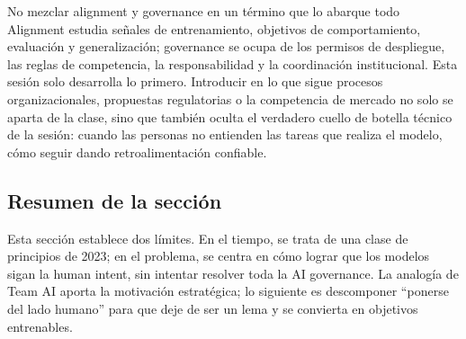 \begin{warningbox}{No mezclar alignment y governance en un término que lo abarque todo}
Alignment estudia señales de entrenamiento, objetivos de comportamiento, evaluación y generalización; governance se ocupa de los permisos de despliegue, las reglas de competencia, la responsabilidad y la coordinación institucional. Esta sesión solo desarrolla lo primero. Introducir en lo que sigue procesos organizacionales, propuestas regulatorias o la competencia de mercado no solo se aparta de la clase, sino que también oculta el verdadero cuello de botella técnico de la sesión: cuando las personas no entienden las tareas que realiza el modelo, cómo seguir dando retroalimentación confiable.
\end{warningbox}

\subsection{Resumen de la sección}

Esta sección establece dos límites. En el tiempo, se trata de una clase de principios de 2023; en el problema, se centra en cómo lograr que los modelos sigan la human intent, sin intentar resolver toda la AI governance. La analogía de Team AI aporta la motivación estratégica; lo siguiente es descomponer ``ponerse del lado humano'' para que deje de ser un lema y se convierta en objetivos entrenables.
